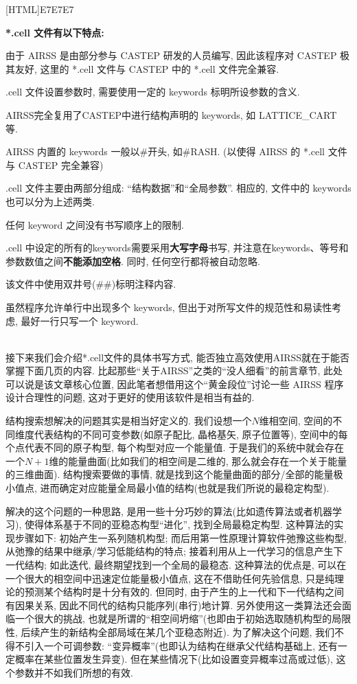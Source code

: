 \documentclass[a4paper, 10pt]{article}
\begin{document}
\noindent{}[HTML]{E7E7E7}{\parbox{\textwidth}{%
\noindent \textbf{*.cell 文件有以下特点:}
\begin{maineu}
\item 由于 AIRSS 是由部分参与 CASTEP 研发的人员编写, 因此该程序对 CASTEP 极其友好, 这里的 *.cell 文件与 CASTEP 中的 *.cell 文件完全兼容.
\item *.cell 文件设置参数时, 需要使用一定的 keywords 标明所设参数的含义.
\item AIRSS完全复用了CASTEP中进行结构声明的 keywords, 如 LATTICE\_CART 等.
\item AIRSS 内置的 keywords 一般以\#开头, 如\#RASH. (以使得 AIRSS 的 *.cell 文件与 CASTEP 完全兼容)
\item *.cell 文件主要由两部分组成: ``结构数据''和``全局参数''. 相应的, 文件中的 keywords 也可以分为上述两类.
\item 任何 keyword 之间没有书写顺序上的限制.
\item *.cell 中设定的所有的keywords需要采用\textbf{大写字母}书写, 并注意在keywords、等号和参数数值之间\textbf{不能添加空格}. 同时, 任何空行都将被自动忽略.
\item 该文件中使用双井号(\#\#)标明注释内容.
\item 虽然程序允许单行中出现多个 keywords, 但出于对所写文件的规范性和易读性考虑, 最好一行只写一个 keyword.
\end{maineu}}}\\

接下来我们会介绍*.cell文件的具体书写方式, 能否独立高效使用AIRSS就在于能否掌握下面几页的内容. 比起那些``关于AIRSS''之类的``没人细看''的前言章节, 此处可以说是该文章核心位置, 因此笔者想借用这个``黄金段位''讨论一些 AIRSS 程序设计合理性的问题, 这对于更好的使用该软件是相当有益的.

结构搜索想解决的问题其实是相当好定义的. 我们设想一个\(N\)维相空间, 空间的不同维度代表结构的不同可变参数(如原子配比, 晶格基矢, 原子位置等), 空间中的每个点代表不同的原子构型, 每个构型对应一个能量值. 于是我们的系统中就会存在一个\(N+1\)维的能量曲面(比如我们的相空间是二维的, 那么就会存在一个关于能量的三维曲面). 结构搜索要做的事情, 就是找到这个能量曲面的部分/全部的能量极小值点, 进而确定对应能量全局最小值的结构(也就是我们所说的最稳定构型).

解决的这个问题的一种思路, 是用一些十分巧妙的算法(比如遗传算法或者机器学习), 使得体系基于不同的亚稳态构型``进化'', 找到全局最稳定构型. 这种算法的实现步骤如下: 初始产生一系列随机构型; 而后用第一性原理计算软件弛豫这些构型, 从弛豫的结果中继承/学习低能结构的特点; 接着利用从上一代学习的信息产生下一代结构; 如此迭代, 最终期望找到一个全局的最稳态. 这种算法的优点是, 可以在一个很大的相空间中迅速定位能量极小值点, 这在不借助任何先验信息, 只是纯理论的预测某个结构时是十分有效的. 但同时, 由于产生的上一代和下一代结构之间有因果关系, 因此不同代的结构只能序列(串行)地计算. 另外使用这一类算法还会面临一个很大的挑战, 也就是所谓的``相空间坍缩''(也即由于初始选取随机构型的局限性, 后续产生的新结构全部局域在某几个亚稳态附近). 为了解决这个问题, 我们不得不引入一个可调参数: ``变异概率''(也即认为结构在继承父代结构基础上, 还有一定概率在某些位置发生异变). 但在某些情况下(比如设置变异概率过高或过低), 这个参数并不如我们所想的有效. 
\end{document}
